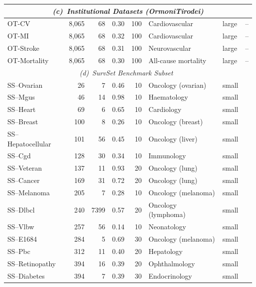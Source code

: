 \begin{longtable}{lrrrrlll}
\midrule
\multicolumn{8}{c}{\textit{(c)~Institutional Datasets (OrmoniTirodei)}} \\
\midrule
OT-CV & 8,065 & 68 & 0.30 & 100 & Cardiovascular & large & -- \\
OT-MI & 8,065 & 68 & 0.32 & 100 & Cardiovascular & large & -- \\
OT-Stroke & 8,065 & 68 & 0.31 & 100 & Neurovascular & large & -- \\
OT-Mortality & 8,065 & 68 & 0.30 & 100 & All-cause mortality & large & -- \\
\midrule
\multicolumn{8}{c}{\textit{(d)~SurvSet Benchmark Subset~\cite{drysdale2022survset}}} \\
\midrule
SS--Ovarian & 26 & 7 & 0.46 & 10 & Oncology (ovarian) & small & \cite{edmonson1979different} \\
SS--Mgus & 46 & 14 & 0.98 & 10 & Haematology & small & \cite{kyle2002longterm} \\
SS--Heart & 69 & 6 & 0.65 & 10 & Cardiology & small & \cite{crowley1977covariance} \\
SS--Breast & 100 & 8 & 0.26 & 10 & Oncology (breast) & small & \cite{schumacher1994randomized} \\
SS--Hepatocellular & 101 & 56 & 0.45 & 10 & Oncology (liver) & small & \cite{llovet1999prognosis} \\
SS--Cgd & 128 & 30 & 0.34 & 10 & Immunology & small & \cite{fleming1991counting} \\
SS--Veteran & 137 & 11 & 0.93 & 20 & Oncology (lung) & small & \cite{kalbfleisch1980statistical} \\
SS--Cancer & 169 & 31 & 0.72 & 20 & Oncology (lung) & small & \cite{loprinzi1994prospective} \\
SS--Melanoma & 205 & 7 & 0.28 & 10 & Oncology (melanoma) & small & \cite{drzewiecki1980biopsy} \\
SS--Dlbcl & 240 & 7399 & 0.57 & 20 & Oncology (lymphoma) & small & \cite{rosenwald2002use} \\
SS--Vlbw & 257 & 56 & 0.14 & 10 & Neonatology & small & \cite{oshea1992prenatal} \\
SS--E1684 & 284 & 5 & 0.69 & 30 & Oncology (melanoma) & small & \cite{kirkwood1996interferon} \\
SS--Pbc & 312 & 11 & 0.40 & 20 & Hepatology & small & \cite{fleming1991counting} \\
SS--Retinopathy & 394 & 16 & 0.39 & 20 & Ophthalmology & small & \cite{huster1989modelling} \\
SS--Diabetes & 394 & 7 & 0.39 & 30 & Endocrinology & small & \cite{collett2015modelling} \\

\end{longtable}
